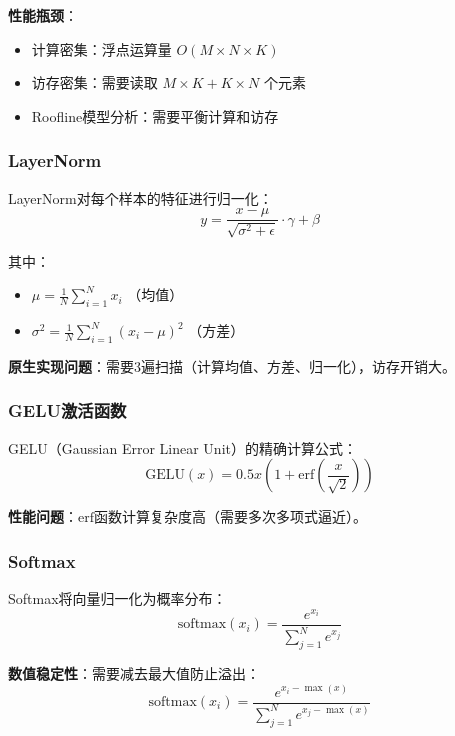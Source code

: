 \documentclass[12pt,a4paper]{article}
\begin{document}
\textbf{性能瓶颈}：
\begin{itemize}
    \item 计算密集：浮点运算量 $O(M \times N \times K)$
    \item 访存密集：需要读取 $M \times K + K \times N$ 个元素
    \item Roofline模型分析：需要平衡计算和访存
\end{itemize}

\subsubsection{LayerNorm}

LayerNorm对每个样本的特征进行归一化：
\begin{equation}
    y = \frac{x - \mu}{\sqrt{\sigma^2 + \epsilon}} \cdot \gamma + \beta
\end{equation}

其中：
\begin{itemize}
    \item $\mu = \frac{1}{N}\sum_{i=1}^N x_i$ （均值）
    \item $\sigma^2 = \frac{1}{N}\sum_{i=1}^N (x_i - \mu)^2$ （方差）
\end{itemize}

\textbf{原生实现问题}：需要3遍扫描（计算均值、方差、归一化），访存开销大。

\subsubsection{GELU激活函数}

GELU（Gaussian Error Linear Unit）的精确计算公式：
\begin{equation}
    \text{GELU}(x) = 0.5x \left(1 + \text{erf}\left(\frac{x}{\sqrt{2}}\right)\right)
\end{equation}

\textbf{性能问题}：$\text{erf}$函数计算复杂度高（需要多次多项式逼近）。

\subsubsection{Softmax}

Softmax将向量归一化为概率分布：
\begin{equation}
    \text{softmax}(x_i) = \frac{e^{x_i}}{\sum_{j=1}^N e^{x_j}}
\end{equation}

\textbf{数值稳定性}：需要减去最大值防止溢出：
\begin{equation}
    \text{softmax}(x_i) = \frac{e^{x_i - \max(x)}}{\sum_{j=1}^N e^{x_j - \max(x)}}
\end{equation}
\end{document}
